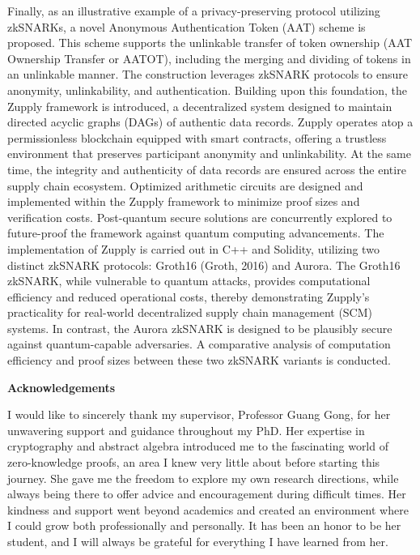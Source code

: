 Finally, as an illustrative example of a privacy-preserving protocol utilizing zkSNARKs, a novel Anonymous Authentication Token (AAT) scheme is proposed. This scheme supports the unlinkable transfer of token ownership (AAT Ownership Transfer or AATOT), including the merging and dividing of tokens in an unlinkable manner. The construction leverages zkSNARK protocols to ensure anonymity, unlinkability, and authentication. Building upon this foundation, the Zupply framework is introduced, a decentralized system designed to maintain directed acyclic graphs (DAGs) of authentic data records. Zupply operates atop a permissionless blockchain equipped with smart contracts, offering a trustless environment that preserves participant anonymity and unlinkability. At the same time, the integrity and authenticity of data records are ensured across the entire supply chain ecosystem. Optimized arithmetic circuits are designed and implemented within the Zupply framework to minimize proof sizes and verification costs. Post-quantum secure solutions are concurrently explored to future-proof the framework against quantum computing advancements. The implementation of Zupply is carried out in C++ and Solidity, utilizing two distinct zkSNARK protocols: Groth16 (Groth, 2016) and Aurora. The Groth16 zkSNARK, while vulnerable to quantum attacks, provides computational efficiency and reduced operational costs, thereby demonstrating Zupply’s practicality for real-world decentralized supply chain management (SCM) systems. In contrast, the Aurora zkSNARK is designed to be plausibly secure against quantum-capable adversaries. A comparative analysis of computation efficiency and proof sizes between these two zkSNARK variants is conducted.






\cleardoublepage
{}    %

\begin{center}\textbf{Acknowledgements}\end{center}

I would like to sincerely thank my supervisor, Professor Guang Gong, for her unwavering support and guidance throughout my PhD. Her expertise in cryptography and abstract algebra introduced me to the fascinating world of zero-knowledge proofs, an area I knew very little about before starting this journey. She gave me the freedom to explore my own research directions, while always being there to offer advice and encouragement during difficult times. Her kindness and support went beyond academics and created an environment where I could grow both professionally and personally. It has been an honor to be her student, and I will always be grateful for everything I have learned from her.

